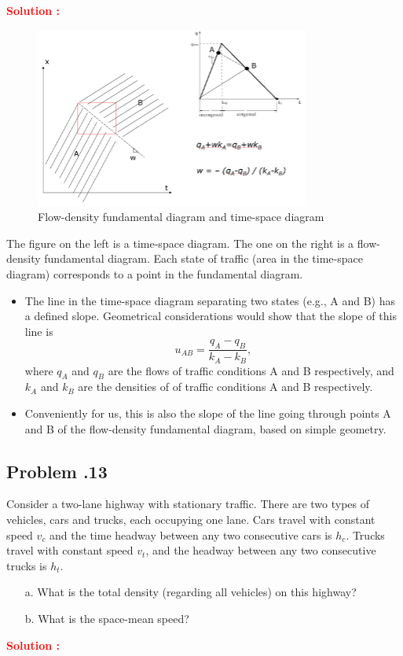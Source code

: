 \documentclass[12pt]{article}
\newcommand{\customsubsection}[1]{
  \subsection*{Problem \thesection.#1}
}
\begin{document}
\textbf{\textcolor{red}{Solution :}} \\
\begin{figure}[h!]
    \centering
    \includegraphics[width=0.75\linewidth]{img/P6_5.png}
    \caption{Flow-density fundamental diagram and time-space diagram}
    \label{fig:P6_5}
\end{figure}

The figure on the left is a time-space diagram. The one on the right is a flow-density fundamental diagram. Each state of traffic (area in the time-space diagram) corresponds to a point in the fundamental diagram.

\begin{itemize}
    \item The line in the time-space diagram separating two states (e.g., A and B) has a defined slope. Geometrical considerations would show that the slope of this line is 
    \[
    u_{AB} = \frac{q_A - q_B}{k_A - k_B},
    \]
    where $q_A$ and $q_B$ are the flows of traffic conditions A and B respectively, and $k_A$ and $k_B$ are the densities of of traffic conditions A and B respectively.
    
    \item Conveniently for us, this is also the slope of the line going through points A and B of the flow-density fundamental diagram, based on simple geometry.
    
\end{itemize}


\newpage






\customsubsection{13}
Consider a two-lane highway with stationary traffic. There are two types of vehicles, cars and trucks, each occupying one lane. Cars travel with constant speed $v_c$ and the time headway between any two consecutive cars is $h_c$. Trucks travel with constant speed $v_t$, and the headway between any two consecutive trucks is $h_t$. 
\begin{enumerate}
    \item[a.] What is the total density (regarding all vehicles) on this highway?
    \item[b.] What is the space-mean speed?
\end{enumerate}
\textbf{\textcolor{red}{Solution :}} 
\end{document}
